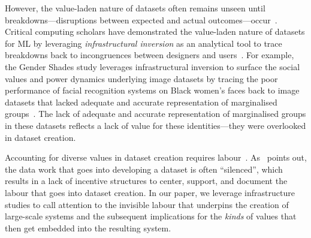 However, the value-laden nature of datasets often remains unseen until breakdowns---disruptions between expected and actual outcomes---occur~\cite{luccioni2023bugs, birhane2024into}. Critical computing scholars have demonstrated the value-laden nature of datasets for ML by leveraging \textit{infrastructural inversion} as an analytical tool to trace breakdowns back to incongruences between designers and users~\cite{scheuermanDatasetsHavePolitics2021,scheuermanHumanDataDataset2023,buolamwiniGenderShades}. For example, the Gender Shades study leverages infrastructural inversion to surface the social values and power dynamics underlying image datasets by tracing the poor performance of facial recognition systems on Black women's faces back to image datasets that lacked adequate and accurate representation of marginalised groups~\cite{buolamwiniGenderShades}. The lack of adequate and accurate representation of marginalised groups in these datasets reflects a lack of value for these identities---they were overlooked in dataset creation. 

Accounting for diverse values in dataset creation requires labour~\cite{scheuermanDatasetsHavePolitics2021,sambasivan2021everyone}. As~\citet{scheuermanDatasetsHavePolitics2021} points out, the data work that goes into developing a dataset is often ``silenced'', which results in a lack of incentive structures to center, support, and document the labour that goes into dataset creation. In our paper, we leverage infrastructure studies to call attention to the invisible labour that underpins the creation of large-scale systems and the subsequent implications for the \textit{kinds} of values that then get embedded into the resulting system. 

